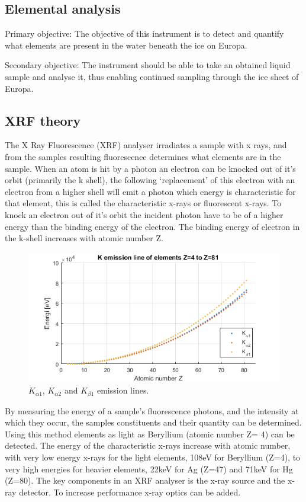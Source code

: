\subsection{Elemental analysis}

Primary objective:
The objective of this instrument is to detect and quantify what elements are present in the water beneath the ice on Europa.

Secondary objective:
The instrument should be able to take an obtained liquid sample and analyse it, thus enabling continued sampling through the ice sheet of Europa.


\subsection{XRF theory}

The X Ray Fluorescence (XRF) analyser irradiates a sample with x rays, and from the samples resulting fluorescence determines what elements are in the sample. 
When an atom is hit by a photon an electron can be knocked out of it’s orbit (primarily  the k shell), the following ‘replacement’ of this electron with an electron from a higher shell  will emit a photon which energy is characteristic for that element, this is called the characteristic x-rays or fluorescent x-rays. To knock an electron out of it’s orbit the incident photon have to be of a higher energy than the binding energy of the electron. The binding energy of electron in the k-shell increases with atomic number Z. 

\begin{figure}[h]
	\centering
	\includegraphics[width=\textwidth]{figures/XRF/Kalpha12Lines.png}
	\caption{$K_{\alpha 1}$, $K_{\alpha 2}$ and $K_{\beta 1}$ emission lines.}
	\label{fig:KalphaEmiLines}
\end{figure}

By measuring the energy of a sample's fluorescence photons, and the intensity at which they occur, the samples constituents and their quantity can be determined. Using this method elements as light as Beryllium (atomic number Z= 4) can be detected. The energy of the characteristic x-rays increase with atomic number, with very low energy x-rays for the light elements, 108eV for Beryllium (Z=4), to very high energies for heavier elements, 22keV for Ag (Z=47) and 71keV for Hg (Z=80).
The key components in an XRF analyser is the x-ray source and the x-ray detector. To increase performance x-ray optics can be added.

